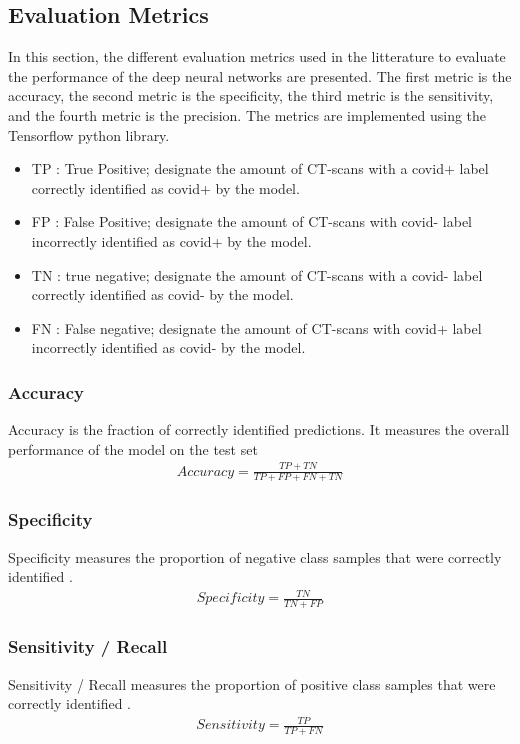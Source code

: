 \documentclass[12pt, letterpaper]{article}
\begin{document}
\subsection{Evaluation Metrics}
In this section, the different evaluation metrics used in the litterature to evaluate the performance of the deep neural networks are presented. The first metric is the accuracy, the second metric is the specificity, the third metric is the sensitivity, and the fourth metric is the precision. The metrics are implemented using the Tensorflow python library.
\begin{itemize}
    \item TP : True Positive; designate the amount of CT-scans with a covid+ label correctly identified as covid+ by the model.
    \item FP : False Positive; designate the amount of CT-scans with covid- label incorrectly identified as covid+ by the model.
    \item TN : true negative; designate the amount of CT-scans with a covid- label correctly identified as covid- by the model.
    \item FN : False negative; designate the amount of CT-scans with covid+ label incorrectly identified as covid- by the model.
\end{itemize}

\subsubsection{Accuracy}
Accuracy is the fraction of correctly identified predictions. It measures the overall performance of the model on the test set \cite{Karthik_2021}
\begin{align}
Accuracy = \frac{TP + TN}{TP + FP + FN + TN}
\end{align}

\subsubsection{Specificity}
Specificity measures the proportion of negative class samples that were correctly identified \cite{Karthik_2021}.
\begin{align}
Specificity = \frac{TN}{TN + FP}
\end{align}

\subsubsection{Sensitivity / Recall}
Sensitivity / Recall measures the proportion of positive class samples that were correctly identified \cite{Karthik_2021}.
\begin{align}
    Sensitivity = \frac{TP}{TP + FN}
\end{align}
\end{document}
